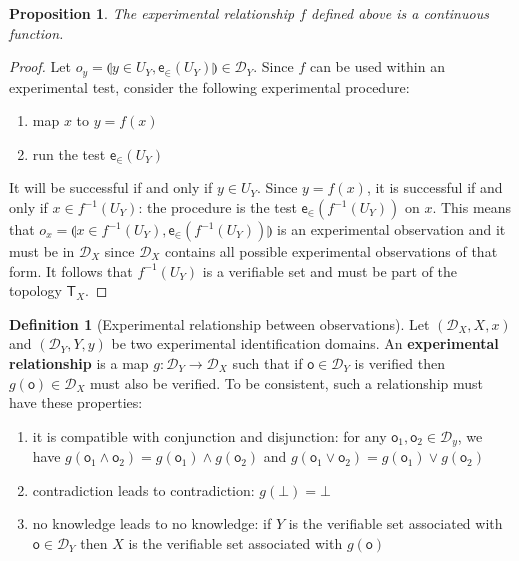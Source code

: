 \documentclass[preprint]{elsarticle}
\theoremstyle{plain}%
\newtheorem{prop}[thm]{Proposition}
\theoremstyle{definition}
\newtheorem{defn}{Definition}[section]
\theoremstyle{remark}
\begin{document}
\begin{prop}
	The experimental relationship $f$ defined above is a continuous function.
\end{prop}
\begin{proof}
Let $o_y = \llparenthesis y\in U_Y,\mathsf{e}_{\in}(U_Y)\rrparenthesis \in \mathcal{D}_Y$.  Since $f$ can be used within an experimental test, consider the following experimental procedure:
\begin{enumerate}
	\item map $x$ to $y=f(x)$
	\item run the test $\mathsf{e}_{\in}(U_Y)$
\end{enumerate}
It will be successful if and only if $y \in U_Y$. Since $y=f(x)$, it is successful if and only if $x \in f^{-1}(U_Y)$: the procedure is the test $\mathsf{e}_{\in}(f^{-1}(U_Y))$ on $x$. This means that $o_x = \llparenthesis x \in f^{-1}(U_Y),\mathsf{e}_{\in}(f^{-1}(U_Y))\rrparenthesis$ is an experimental observation and it must be in $\mathcal{D}_X$ since $\mathcal{D}_X$ contains all possible experimental observations of that form. It follows that $f^{-1}(U_Y)$ is a verifiable set and must be part of the topology $\mathsf{T}_X$.
\end{proof}

\begin{defn}[Experimental relationship between observations]
	Let $(\mathcal{D}_X, X, x)$ and $(\mathcal{D}_Y, Y, y)$ be two experimental identification domains. An \textbf{experimental relationship} is a map $g : \mathcal{D}_Y \rightarrow \mathcal{D}_X$ such that if $\mathsf{o} \in \mathcal{D}_Y$ is verified then $g(\mathsf{o}) \in \mathcal{D}_X$ must also be verified. To be consistent, such a relationship must have these properties:
	\begin{enumerate}
	\item it is compatible with conjunction and disjunction: for any $\mathsf{o}_1, \mathsf{o}_2 \in \mathcal{D}_y$, we have $g(\mathsf{o}_1 \wedge \mathsf{o}_2)=g(\mathsf{o}_1)\wedge g(\mathsf{o}_2)$ and $g(\mathsf{o}_1 \vee \mathsf{o}_2)=g(\mathsf{o}_1)\vee g(\mathsf{o}_2)$
	\item contradiction leads to contradiction: $g(\bot) = \bot$
	\item no knowledge leads to no knowledge: if $Y$ is the verifiable set associated with $\mathsf{o} \in \mathcal{D}_Y$ then $X$ is the verifiable set associated with  $g(\mathsf{o})$
	\end{enumerate}
\end{defn}
\end{document}
